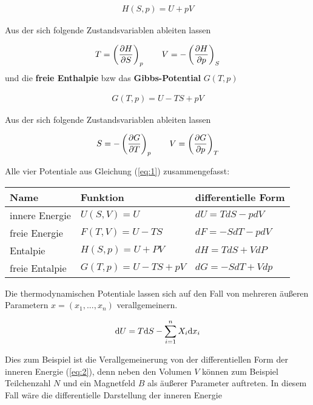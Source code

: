 \begin{align}
  \label{eq:10}
  H(S,p) = U + pV
\end{align}

Aus der sich folgende Zustandsvariablen ableiten lassen

\begin{align}
  \label{eq:11}
  T= \left(\pdiff H_S \right)_p  \qquad V = - \left(\pdiff H_p \right)_S 
\end{align}
und die \textbf{freie Enthalpie} bzw das \textbf{Gibbs-Potential} \(G(T,p)\)

\begin{align}
  \label{eq:12}
  G(T,p) = U - TS + pV
\end{align}

Aus der sich folgende Zustandsvariablen ableiten lassen

\begin{align}
  \label{eq:13}
  S= -\left(\pdiff G_T \right)_p  \qquad V =  \left(\pdiff G_p \right)_T
\end{align}

Alle vier Potentiale aus Gleichung (\ref{eq:1}) zusammengefasst:


\begin{table}[h]
  \centering
  \begin{tabular}{lll}
    Name&Funktion&differentielle Form\\
\hline
innere Energie&\(U(S,V)=U\)&\(dU = TdS-pdV\)\\
freie Energie&\(F(T,V)=U-TS\)&\(dF=-SdT-pdV\)\\
Entalpie & \(H(S,p)=U+PV\)&\(dH = TdS+VdP\)\\
freie Entalpie & \(G(T,p)=U-TS+pV\)&\(dG = -SdT+Vdp\)
  \end{tabular}
\end{table}


Die thermodynamischen Potentiale lassen sich auf den Fall von mehreren äußeren Parametern \(x= (x_1,...,x_n)\) verallgemeinern. 

\begin{align}
  \label{eq:14}
  \diff U = T\diff S - \sum_{i=1}^n X_i \diff{} x_i
\end{align}

Dies zum Beispiel ist die Verallgemeinerung von der differentiellen Form der inneren Energie (\ref{eq:2}), denn neben den Volumen \(V\) können zum Beispiel Teilchenzahl \(N\) und ein Magnetfeld \(B\) als äußerer Parameter auftreten. In diesem Fall wäre die differentielle Darstellung der inneren Energie

